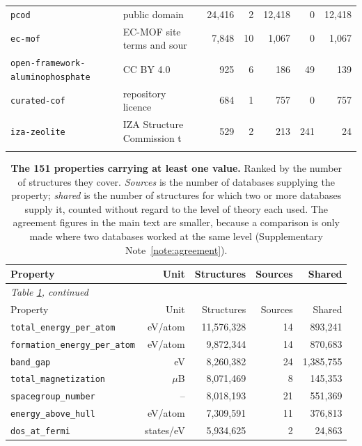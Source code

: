 \begin{table}[htbp]
\begin{tabular}{llrrrrr}
\quad \texttt{pcod} & public domain & 24{,}416 & 2 & 12{,}418 & 0 & 12{,}418 \\
\quad \texttt{ec-mof} & EC-MOF site terms and sour & 7{,}848 & 10 & 1{,}067 & 0 & 1{,}067 \\
\quad \texttt{open-framework-aluminophosphate} & CC BY 4.0 & 925 & 6 & 186 & 49 & 139 \\
\quad \texttt{curated-cof} & repository licence & 684 & 1 & 757 & 0 & 757 \\
\quad \texttt{iza-zeolite} & IZA Structure Commission t & 529 & 2 & 213 & 241 & 24 \\
\addlinespace[2pt]
\bottomrule
\end{tabular}
\end{table}

\begin{longtable}{lrrrr}
\caption{\textbf{The 151 properties carrying at least one value.} Ranked by the number of structures they cover. \emph{Sources} is the number of databases supplying the property; \emph{shared} is the number of structures for which two or more databases supply it, counted without regard to the level of theory each used. The agreement figures in the main text are smaller, because a comparison is only made where two databases worked at the same level (Supplementary Note~\ref{note:agreement}).}\label{tab:properties}\\
\toprule
Property & Unit & Structures & Sources & Shared \\ \midrule \endfirsthead
\multicolumn{5}{l}{\footnotesize\itshape Table \ref{tab:properties}, continued}\\ \toprule
Property & Unit & Structures & Sources & Shared \\ \midrule \endhead
\bottomrule \endfoot
\texttt{total\_energy\_per\_atom} & eV/atom & 11{,}576{,}328 & 14 & 893{,}241 \\
\texttt{formation\_energy\_per\_atom} & eV/atom & 9{,}872{,}344 & 14 & 870{,}683 \\
\texttt{band\_gap} & eV & 8{,}260{,}382 & 24 & 1{,}385{,}755 \\
\texttt{total\_magnetization} & $\mu$B & 8{,}071{,}469 & 8 & 145{,}353 \\
\texttt{spacegroup\_number} & -- & 8{,}018{,}193 & 21 & 551{,}369 \\
\texttt{energy\_above\_hull} & eV/atom & 7{,}309{,}591 & 11 & 376{,}813 \\
\texttt{dos\_at\_fermi} & states/eV & 5{,}934{,}625 & 2 & 24{,}863 \\

\end{longtable}
